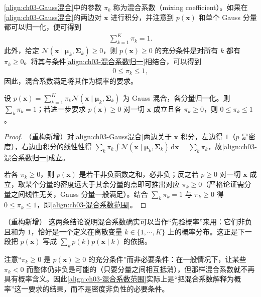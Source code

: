 \documentclass[../../main.tex]{subfiles}
\begin{document}
\eqref{align:ch03-Gauss混合}中的参数 $\pi_{k}$ 称为混合系数（mixing coefficient）。如果在\eqref{align:ch03-Gauss混合}的两边对 $\boldsymbol{x}$ 进行积分，并注意到 $p(\boldsymbol{x})$ 和单个 Gauss 分量都可以归一化，便可得到
\begin{align}
\sum_{k=1}^{K}\pi_{k}=1.
\label{align:ch03-混合系数归一}
\end{align}
此外，给定 $\mathcal{N}(\boldsymbol{x}\mid\boldsymbol{\mu}_{k},\boldsymbol{\Sigma}_{k})\geqslant0$，则 $p(\boldsymbol{x})\geqslant0$ 的充分条件是对所有 $k$ 都有 $\pi_{k}\geqslant0$。将其与条件\eqref{align:ch03-混合系数归一}相结合，可以得到
\begin{align}
0\leqslant\pi_{k}\leqslant1,
\label{align:ch03-混合系数范围}
\end{align}
因此，混合系数满足将其作为概率的要求。

\begin{proposition}[混合系数的归一性与取值范围]\label{proposition:ch03-混合系数}
设 $p(\boldsymbol{x})=\sum_{k=1}^{K}\pi_{k}\mathcal{N}(\boldsymbol{x}\mid\boldsymbol{\mu}_k,\boldsymbol{\Sigma}_k)$ 为 Gauss 混合，各分量归一化。则 $\sum_k\pi_k=1$；若进一步要求 $p(\boldsymbol{x})\geqslant0$ 对一切 $\boldsymbol{x}$ 成立且各 $\pi_k\geqslant0$，则 $0\leqslant\pi_k\leqslant1$。
\end{proposition}
\begin{proof}
（重构新增）对\eqref{align:ch03-Gauss混合}两边关于 $\boldsymbol{x}$ 积分，左边得 $1$（$p$ 是密度），右边由积分的线性性得 $\sum_k\pi_k\int\mathcal{N}(\boldsymbol{x}\mid\boldsymbol{\mu}_k,\boldsymbol{\Sigma}_k)\,\mathrm{d}\boldsymbol{x}=\sum_k\pi_k$，故\eqref{align:ch03-混合系数归一}成立。

若各 $\pi_k\geqslant0$，则 $p(\boldsymbol{x})$ 是若干非负函数之和，必非负；反之若 $p\geqslant0$ 对一切 $\boldsymbol{x}$ 成立，取某个分量的密度远大于其余分量的点即可推出对应 $\pi_k\geqslant0$（严格论证需分量之间线性无关，Gauss 分量一般满足）。结合 $\sum_k\pi_k=1$ 与 $\pi_k\geqslant0$ 得 $0\leqslant\pi_k\leqslant1$，即\eqref{align:ch03-混合系数范围}。
\end{proof}

\begin{remark}（重构新增）
这两条结论说明混合系数确实可以当作“先验概率”来用：它们非负且和为 $1$，恰好是一个定义在离散变量 $k\in\{1,\cdots,K\}$ 上的概率分布。这正是下一段把 $p(\boldsymbol{x})$ 写成 $\sum_k p(k)p(\boldsymbol{x}\mid k)$ 的依据。

注意“$\pi_k\geqslant0$ 是 $p(\boldsymbol{x})\geqslant0$ 的充分条件”而非必要条件：在一般情况下，让某些 $\pi_k<0$ 而整体仍非负是可能的（只要分量之间相互抵消），但那样混合系数就不再具有概率含义。因此\eqref{align:ch03-混合系数范围}实际上是“把混合系数解释为概率”这一要求的结果，而不是密度非负性的必要条件。
\end{remark}
\end{document}
